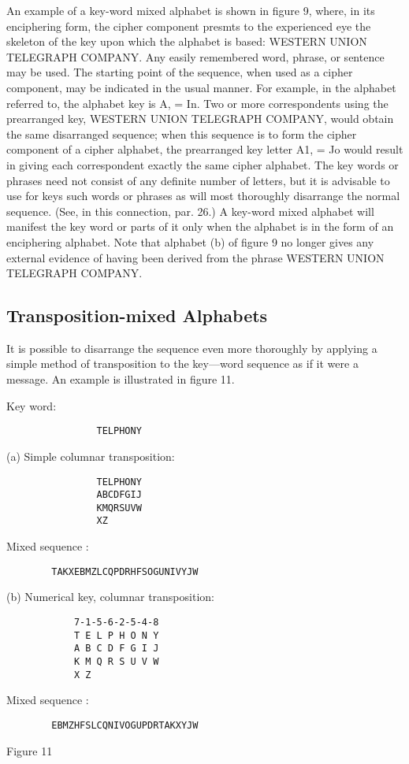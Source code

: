 \mypara An example of a key-word mixed alphabet is shown in ﬁgure 9,
where, in its enciphering form, the cipher component presmts to the
experienced eye the skeleton of the key upon which the alphabet is
based: WESTERN UNION TELEGRAPH COMPANY. Any easily
remembered word, phrase, or sentence may be used. The starting point
of the sequence, when used as a cipher component, may be indicated
in the usual manner. For example, in the alphabet referred to, the
alphabet key is A, = In. Two or more correspondents using the prearranged key, WESTERN UNION TELEGRAPH COMPANY,
would obtain the same disarranged sequence; when this sequence is to
form the cipher component of a cipher alphabet, the prearranged key
letter A1, = Jo would result in giving each correspondent exactly the
same cipher alphabet. The key words or phrases need not consist of any
deﬁnite number of letters, but it is advisable to use for keys such words
or phrases as will most thoroughly disarrange the normal sequence. (See,
in this connection, par. 26.) A key-word mixed alphabet will manifest
the key word or parts of it only when the alphabet is in the form of
an enciphering alphabet. Note that alphabet (b) of ﬁgure 9 no longer
gives any external evidence of having been derived from the phrase
WESTERN UNION TELEGRAPH COMPANY.

\subsection{Transposition-mixed Alphabets}

\mypara It is possible to disarrange the sequence even more thoroughly by
applying a simple method of transposition to the key—word sequence
as if it were a message. An example is illustrated in ﬁgure 11.

Key word:
\begin{textfigure}
        \begin{verbatim}
                TELPHONY
        \end{verbatim}

(a) Simple columnar transposition:
    \begin{verbatim}
                TELPHONY
                ABCDFGIJ
                KMQRSUVW
                XZ
    \end{verbatim}

Mixed sequence :
        \begin{verbatim}
        TAKXEBMZLCQPDRHFSOGUNIVYJW
    \end{verbatim}

(b) Numerical key, columnar transposition:

        \begin{verbatim}
            7-1-5-6-2-5-4-8
            T E L P H O N Y
            A B C D F G I J
            K M Q R S U V W
            X Z
        \end{verbatim}

Mixed sequence :
        \begin{verbatim}
        EBMZHFSLCQNIVOGUPDRTAKXYJW
        \end{verbatim}
        \caption{Figure 11}
\end{textfigure}

